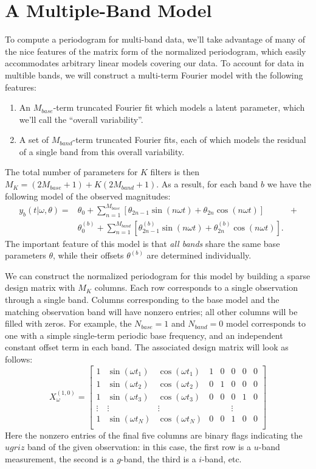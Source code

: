 \documentclass[12pt,preprint]{aastex}
\newcommand{\sectlabel}[1]{\label{sect:#1}}
\begin{document}
\section{A Multiple-Band Model}
\sectlabel{multiband}
To compute a periodogram for multi-band data, we'll take advantage of many of the nice features of the matrix form of the normalized periodogram, which easily accommodates arbitrary linear models covering our data.
To account for data in multible bands, we will construct a multi-term Fourier model with the following features:
\begin{enumerate}
  \item An $M_{base}$-term truncated Fourier fit which models a latent parameter, which we'll call the ``overall variability''.
  \item A set of $M_{band}$-term truncated Fourier fits, each of which models the residual of a single band from this overall variability.
\end{enumerate}
The total number of parameters for $K$ filters is then $M_K = (2M_{base} + 1) + K(2M_{band} + 1)$. As a result, for each band $b$ we have the following model of the observed magnitudes:
\begin{eqnarray}
  y_b(t|\omega,\theta) = &\theta_0 + \sum_{n=1}^{M_{base}} \left[\theta_{2n - 1}\sin(n\omega t) + \theta_{2n}\cos(n\omega t)\right]& +\\ 
  &\theta^{(b)}_0 + \sum_{n=1}^{M_{band}} \left[\theta^{(b)}_{2n - 1}\sin(n\omega t) + \theta^{(b)}_{2n}\cos(n\omega t)\right].&
\end{eqnarray}
The important feature of this model is that {\it all bands} share the same base parameters $\theta$, while their offsets $\theta^{(b)}$ are determined individually.

We can construct the normalized periodogram for this model by building a sparse design matrix with $M_K$ columns. Each row corresponds to a single observation through a single band. Columns corresponding to the base model and the matching observation band will have nonzero entries; all other columns will be filled with zeros. For example, the $N_{base}=1$ and $N_{band}=0$ model corresponds to one with a simple single-term periodic base frequency, and an independent constant offset term in each band. The associated design matrix will look as follows:
\begin{equation}
X_\omega^{(1,0)} = \left[
\begin{array}{cccccccc}
1 & \sin(\omega t_1) & \cos(\omega t_1) & 1 & 0 & 0 & 0 & 0\\
1 & \sin(\omega t_2) & \cos(\omega t_2) & 0 & 1 & 0 & 0 & 0\\
1 & \sin(\omega t_3) & \cos(\omega t_3) & 0 & 0 & 0 & 1 & 0\\
\vdots & \vdots & \vdots & & & \vdots & &\\
1 & \sin(\omega t_N) & \cos(\omega t_N) & 0 & 0 & 1 & 0 & 0\\
\end{array}
\right]
\end{equation}
Here the nonzero entries of the final five columns are binary flags indicating the $ugriz$ band of the given observation: in this case, the first row is a $u$-band measurement, the second is a $g$-band, the third is a $i$-band, etc.
\end{document}
